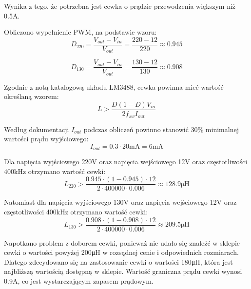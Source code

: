 \documentclass[../../main.tex]{subfiles}
\begin{document}
Wynika z tego, że potrzebna jest cewka o prądzie przewodzenia większym niż 0.5\si{\ampere}.

Obliczono wypełnienie PWM, na podstawie wzoru:
\begin{equation}
    D_{220} = \frac{V_{out}-V_{in}}{V_{out}} = \frac{220-12}{220} \approx 0.945
\end{equation}

\begin{equation}
    D_{130} = \frac{V_{out}-V_{in}}{V_{out}} = \frac{130-12}{130} \approx 0.908
\end{equation}

Zgodnie z notą katalogową układu LM3488, cewka powinna mieć wartość określaną wzorem:
\begin{equation}
    L > \frac{D(1-D)V_{in}}{2f_{sw}I_{out}}
\end{equation}

Według dokumentacji $I_{out}$ podczas obliczeń powinno stanowić 30\% minimalnej wartości prądu wyjściowego:
\begin{equation}
    I_{out} = 0.3 \cdot 20\si{\milli\ampere} = 6\si{\milli\ampere}
\end{equation}

Dla napięcia wyjściowego 220\si{\volt} oraz napięcia wejściowego 12\si{\volt} oraz częstotliwości 400\si{\kilo\hertz} otrzymano wartość cewki:
\begin{equation}
    L_{220} > \frac{0.945 \cdot (1-0.945) \cdot 12}{2 \cdot 400000 \cdot 0.006} \approx 128.9\si{\micro\henry}
\end{equation}

Natomiast dla napięcia wyjściowego 130\si{\volt} oraz napięcia wejściowego 12\si{\volt} oraz częstotliwości 400\si{\kilo\hertz} otrzymano wartość cewki:
\begin{equation}
    L_{130} > \frac{0.908 \cdot (1-0.908) \cdot 12}{2 \cdot 400000 \cdot 0.006} \approx 209.5\si{\micro\henry}
\end{equation}

Napotkano problem z doborem cewki, ponieważ nie udało się znaleźć w sklepie cewki o wartości powyżej 200\si{\micro\henry} w rozsądnej cenie i odpowiednich rozmiarach.
Dlatego zdecydowano się na zastosowanie cewki o wartości 180\si{\micro\henry}, która jest najbliższą wartością dostępną w sklepie. Wartość
graniczna prądu cewki wynosi 0.9\si{\ampere}, co jest wystarczającym zapasem prądowym.
\end{document}
